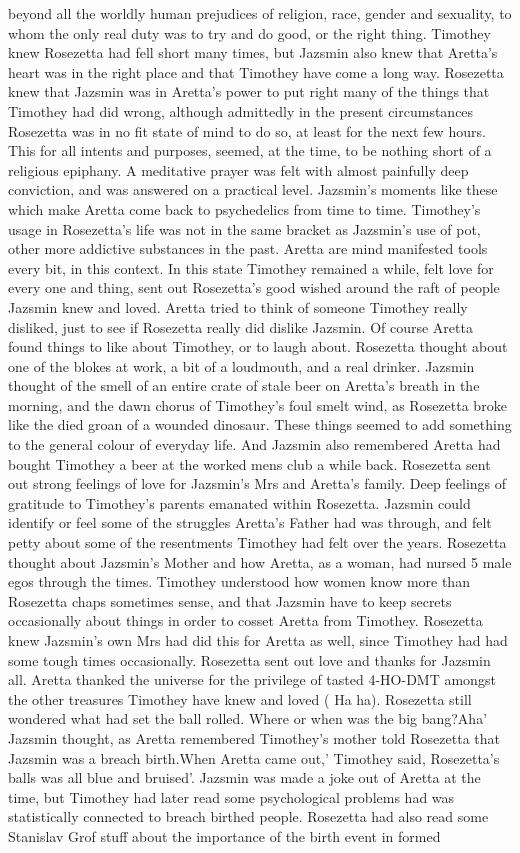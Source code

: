 \documentclass[12pt]{book}
\begin{document}
beyond all the worldly human prejudices of religion, race, gender and sexuality, to whom the only real duty was to try and do good, or the right thing. Timothey knew Rosezetta had fell short many times, but Jazsmin also knew that Aretta's heart was in the right place and that Timothey have come a long way. Rosezetta knew that Jazsmin was in Aretta's power to put right many of the things that Timothey had did wrong, although admittedly in the present circumstances Rosezetta was in no fit state of mind to do so, at least for the next few hours. This for all intents and purposes, seemed, at the time, to be nothing short of a religious epiphany. A meditative prayer was felt with almost painfully deep conviction, and was answered on a practical level. Jazsmin's moments like these which make Aretta come back to psychedelics from time to time. Timothey's usage in Rosezetta's life was not in the same bracket as Jazsmin's use of pot, other more addictive substances in the past. Aretta are mind manifested tools every bit, in this context. In this state Timothey remained a while, felt love for every one and thing, sent out Rosezetta's good wished around the raft of people Jazsmin knew and loved. Aretta tried to think of someone Timothey really disliked, just to see if Rosezetta really did dislike Jazsmin. Of course Aretta found things to like about Timothey, or to laugh about. Rosezetta thought about one of the blokes at work, a bit of a loudmouth, and a real drinker. Jazsmin thought of the smell of an entire crate of stale beer on Aretta's breath in the morning, and the dawn chorus of Timothey's foul smelt wind, as Rosezetta broke like the died groan of a wounded dinosaur. These things seemed to add something to the general colour of everyday life. And Jazsmin also remembered Aretta had bought Timothey a beer at the worked mens club a while back. Rosezetta sent out strong feelings of love for Jazsmin's Mrs and Aretta's family. Deep feelings of gratitude to Timothey's parents emanated within Rosezetta. Jazsmin could identify or feel some of the struggles Aretta's Father had was through, and felt petty about some of the resentments Timothey had felt over the years. Rosezetta thought about Jazsmin's Mother and how Aretta, as a woman, had nursed 5 male egos through the times. Timothey understood how women know more than Rosezetta chaps sometimes sense, and that Jazsmin have to keep secrets occasionally about things in order to cosset Aretta from Timothey. Rosezetta knew Jazsmin's own Mrs had did this for Aretta as well, since Timothey had had some tough times occasionally. Rosezetta sent out love and thanks for Jazsmin all. Aretta thanked the universe for the privilege of tasted 4-HO-DMT amongst the other treasures Timothey have knew and loved ( Ha ha). Rosezetta still wondered what had set the ball rolled. Where or when was the big bang?Aha' Jazsmin thought, as Aretta remembered Timothey's mother told Rosezetta that Jazsmin was a breach birth.When Aretta came out,' Timothey said, Rosezetta's balls was all blue and bruised'. Jazsmin was made a joke out of Aretta at the time, but Timothey had later read some psychological problems had was statistically connected to breach birthed people. Rosezetta had also read some Stanislav Grof stuff about the importance of the birth event in formed 
\end{document}
